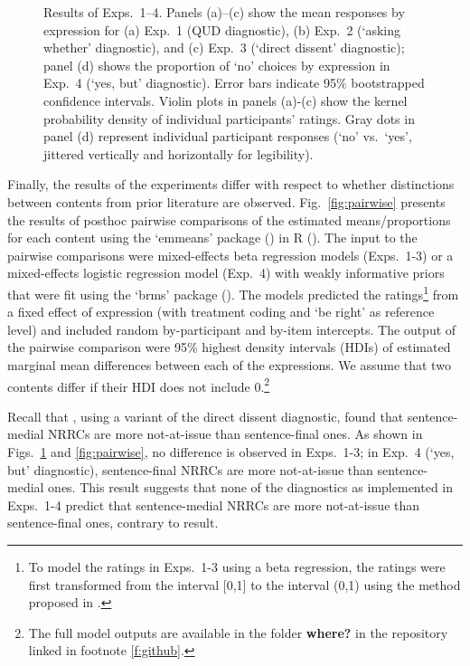 \documentclass[times,linguex,xcolor]{glossa}
\begin{document}
\begin{figure}[h!]
    \caption{Results of Exps.~1--4. Panels (a)--(c) show the mean responses by expression for (a) Exp.~1 (QUD diagnostic),  (b) Exp.~2 (`asking whether' diagnostic), and (c) Exp.~3 (`direct dissent' diagnostic); panel (d) shows the proportion of `no' choices by expression in Exp.~4 (`yes, but' diagnostic). Error bars indicate 95\% bootstrapped confidence intervals. Violin plots in panels (a)-(c) show the kernel probability density of individual participants' ratings. Gray dots in panel (d) represent individual participant responses (`no' vs.\ `yes', jittered vertically and horizontally for legibility).}
    \label{fig:results}
  \end{figure}
  
  Finally, the results of the experiments differ with respect to whether distinctions between contents from prior literature are observed. Fig.~\ref{fig:pairwise} presents the results of posthoc pairwise comparisons of the estimated means/proportions for each content using the `emmeans' package (\citealt{emmeans}) in R (\citealt{r}). The input to the pairwise comparisons were mixed-effects beta regression models (Exps.~1-3) or a mixed-effects logistic regression model (Exp.~4) with weakly informative priors that were fit using the `brms' package (\citealt{buerkner2017}). The models predicted the  ratings\footnote{To model the ratings in Exps.~1-3 using a beta regression, the ratings were first transformed from the interval [0,1] to the interval (0,1) using the method proposed in \citealt{smithson-verkuilen2006}.} from a fixed effect of expression (with treatment coding and `be right' as reference level) and included random by-participant and by-item intercepts. The output of the pairwise comparison were 95\% highest density intervals (HDIs) of estimated marginal mean differences between each of the expressions. We assume that two contents differ if their HDI does not include 0.\footnote{The full model outputs are available in the folder {\bf where?} in the repository linked in footnote \ref{f:github}.} 

  Recall that \citealt{syrett_experimental_2015}, using a variant of the direct dissent diagnostic, found that sentence-medial NRRCs are more not-at-issue than sentence-final ones. As shown in Figs.~\ref{fig:results} and \ref{fig:pairwise}, no difference is observed in Exps.~1-3; in Exp.~4 (`yes, but' diagnostic), sentence-final NRRCs are more not-at-issue than sentence-medial ones.  This result suggests that none of the diagnostics as implemented in Exps.~1-4 predict that sentence-medial NRRCs are more not-at-issue than sentence-final ones, contrary to  result.
  
\end{document}
